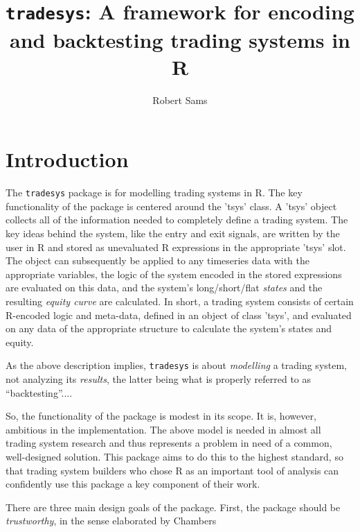 \documentclass[a4]{article}
\newcommand{\code}[1]{\texttt{#1}}
\begin{document}
\author{Robert Sams}
\title{\code{tradesys}: A framework for encoding and backtesting trading systems in R}
\maketitle



\section{Introduction} \label{sec:intro}
The \code{tradesys} package is for modelling trading systems in R. The
key functionality of the package is centered around the 'tsys'
class. A 'tsys' object collects all of the information needed to
completely define a trading system. The key ideas behind the system,
like the entry and exit signals, are written by the user in R and
stored as unevaluated R expressions in the appropriate 'tsys'
slot. The object can subsequently be applied to any timeseries data
with the appropriate variables, the logic of the system encoded in the
stored expressions are evaluated on this data, and the system's
long/short/flat \emph{states} and the resulting \emph{equity curve}
are calculated. In short, a trading system consists of certain
R-encoded logic and meta-data, defined in an object of class 'tsys',
and evaluated on any data of the appropriate structure to calculate
the system's states and equity.

As the above description implies, \code{tradesys} is about
\emph{modelling} a trading system, not analyzing its \emph{results},
the latter being what is properly referred to as ``backtesting''....

So, the functionality of the package is modest in its scope. It is,
however, ambitious in the implementation. The above model is needed in
almost all trading system research and thus represents a problem in
need of a common, well-designed solution. This package aims to do this
to the highest standard, so that trading system builders who chose R
as an important tool of analysis can confidently use this package a
key component of their work.

There are three main design goals of the package. First, the package
should be \emph{trustworthy}, in the sense elaborated by Chambers 
\end{document}
